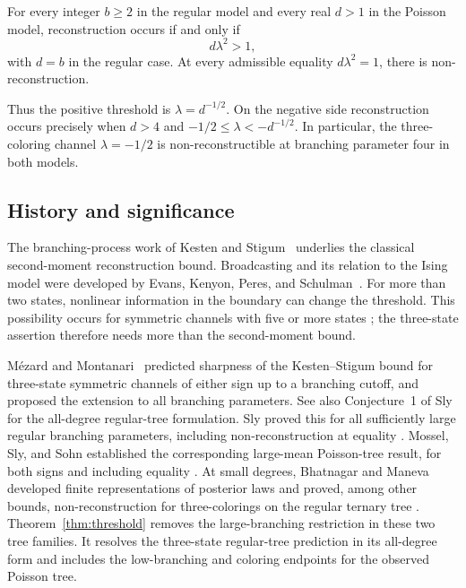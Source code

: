 \begin{theorem}\label{thm:threshold}
For every integer $b\ge2$ in the regular model and every real $d>1$
in the Poisson model, reconstruction occurs if and only if
\[
 d\lambda^2>1,
\]
with $d=b$ in the regular case. At every admissible equality
$d\lambda^2=1$, there is non-reconstruction.
\end{theorem}
Thus the positive threshold is $\lambda=d^{-1/2}$. On the negative
side reconstruction occurs precisely when $d>4$ and
$-1/2\le\lambda<-d^{-1/2}$. In particular, the three-coloring channel
$\lambda=-1/2$ is non-reconstructible at branching parameter four in
both models.

\subsection{History and significance}
The branching-process work of Kesten and Stigum~\cite{KestenStigum1966}
underlies the classical second-moment reconstruction bound. Broadcasting
and its relation to the Ising model were developed by Evans, Kenyon,
Peres, and Schulman~\cite{EvansEtAl2000}. For more than two states,
nonlinear information in the boundary can change the threshold. This
possibility occurs for symmetric channels with five or more states
\cite[Theorem~1.2]{Sly2011}; the three-state assertion therefore needs
more than the second-moment bound.

M\'ezard and Montanari~\cite[Conjecture~2 and the following paragraph]{MezardMontanari2006}
predicted sharpness of the Kesten--Stigum bound for three-state symmetric
channels of either sign up to a branching cutoff, and proposed the
extension to all branching parameters. See also Conjecture~1 of
Sly~\cite{Sly2011} for the all-degree regular-tree formulation.
Sly proved this for all sufficiently large regular branching parameters,
including non-reconstruction at equality
\cite[Theorem~1.1]{Sly2011}. Mossel, Sly, and Sohn established the
corresponding large-mean Poisson-tree result, for both signs and including
equality \cite[Theorem~1.12]{MosselSlySohn2025}.
At small degrees, Bhatnagar and Maneva developed finite representations
of posterior laws and proved, among other bounds, non-reconstruction
for three-colorings on the regular ternary tree
\cite[Theorem~12]{BhatnagarManeva2011}.
Theorem~\ref{thm:threshold} removes the large-branching restriction in
these two tree families. It resolves the three-state regular-tree
prediction in its all-degree form and includes the low-branching and
coloring endpoints for the observed Poisson tree.

